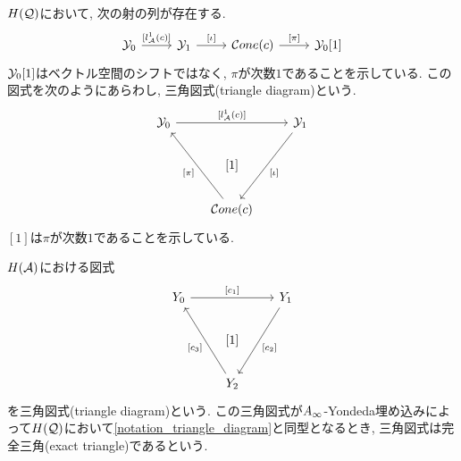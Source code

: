 \documentclass[uplatex, a4paper, 14Q, dvipdfmx]{jsarticle}
\begin{document}
\begin{notation}[三角図式] \label{notation_triangle_diagram}
  $H(\mathcal{Q})$において, 次の射の列が存在する. 
  \[\begin{tikzcd}
    {\Y_0} & {\Y_1} & {\Cone(c)} & {\Y_0[1]}
    \arrow["{[l_\A^1(c)]}", from=1-1, to=1-2]
    \arrow["{[\iota]}", from=1-2, to=1-3]
    \arrow["{[\pi]}", from=1-3, to=1-4]
  \end{tikzcd}\]
  $\mathcal{Y}_0[1]$はベクトル空間のシフトではなく, $\pi$が次数$1$であることを示している. 
  この図式を次のようにあらわし, 三角図式(triangle diagram)という. 
  \[\begin{tikzcd}
    {\Y_0} && {\Y_1} \\
    & {[1]} \\
    & {\Cone(c)}
    \arrow["{[l_\A^1(c)]}", from=1-1, to=1-3]
    \arrow["{[\iota]}", from=1-3, to=3-2]
    \arrow["{[\pi] }", from=3-2, to=1-1]
  \end{tikzcd}\]
  $[1]$は$\pi$が次数$1$であることを示している. 
\end{notation}

\begin{definition}[完全三角] \label{def_triangle_diagram}
  $H(\mathcal{A})$における図式
  \[\begin{tikzcd}
    {Y_0} && {Y_1} \\
    & {[1]} \\
    & {Y_2}
    \arrow["{[c_1]}", from=1-1, to=1-3]
    \arrow["{[c_2]}", from=1-3, to=3-2]
    \arrow["{[c_3] }", from=3-2, to=1-1]
  \end{tikzcd}\]
  を三角図式(triangle diagram)という. 
  この三角図式が$A_{\infty}$-Yondeda埋め込みによって$H(\mathcal{Q})$において\cref{notation_triangle_diagram}と同型となるとき, 三角図式は完全三角(exact triangle)であるという. 
\end{definition}
\end{document}
